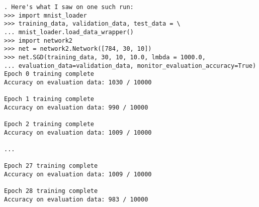 \begin{lstlisting}
. Here's what I saw on one such run:
>>> import mnist_loader
>>> training_data, validation_data, test_data = \
... mnist_loader.load_data_wrapper()
>>> import network2
>>> net = network2.Network([784, 30, 10])
>>> net.SGD(training_data, 30, 10, 10.0, lmbda = 1000.0,
... evaluation_data=validation_data, monitor_evaluation_accuracy=True)
Epoch 0 training complete
Accuracy on evaluation data: 1030 / 10000

Epoch 1 training complete
Accuracy on evaluation data: 990 / 10000

Epoch 2 training complete
Accuracy on evaluation data: 1009 / 10000

...

Epoch 27 training complete
Accuracy on evaluation data: 1009 / 10000

Epoch 28 training complete
Accuracy on evaluation data: 983 / 10000


\end{lstlisting}
